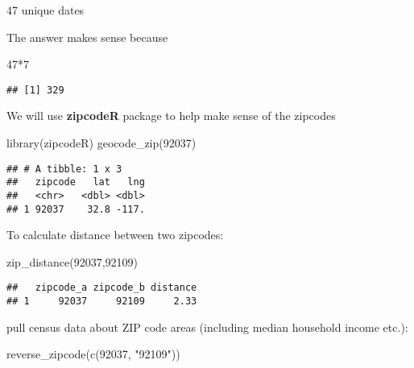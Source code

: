 \documentclass[
]{article}
\newenvironment{Shaded}{\begin{snugshade}}{\end{snugshade}}
\newcommand{\DecValTok}[1]{\textcolor[rgb]{0.00,0.00,0.81}{#1}}
\newcommand{\FunctionTok}[1]{\textcolor[rgb]{0.00,0.00,0.00}{#1}}
\newcommand{\NormalTok}[1]{#1}
\newcommand{\SpecialCharTok}[1]{\textcolor[rgb]{0.00,0.00,0.00}{#1}}
\newcommand{\StringTok}[1]{\textcolor[rgb]{0.31,0.60,0.02}{#1}}
\begin{document}
47 unique dates

The answer makes sense because

\begin{Shaded}
\begin{Highlighting}[]
\DecValTok{47}\SpecialCharTok{*}\DecValTok{7}
\end{Highlighting}
\end{Shaded}

\begin{verbatim}
## [1] 329
\end{verbatim}

We will use \textbf{zipcodeR} package to help make sense of the zipcodes

\begin{Shaded}
\begin{Highlighting}[]
\FunctionTok{library}\NormalTok{(zipcodeR)}
\FunctionTok{geocode\_zip}\NormalTok{(}\StringTok{\textquotesingle{}92037\textquotesingle{}}\NormalTok{)}
\end{Highlighting}
\end{Shaded}

\begin{verbatim}
## # A tibble: 1 x 3
##   zipcode   lat   lng
##   <chr>   <dbl> <dbl>
## 1 92037    32.8 -117.
\end{verbatim}

To calculate distance between two zipcodes:

\begin{Shaded}
\begin{Highlighting}[]
\FunctionTok{zip\_distance}\NormalTok{(}\StringTok{\textquotesingle{}92037\textquotesingle{}}\NormalTok{,}\StringTok{\textquotesingle{}92109\textquotesingle{}}\NormalTok{)}
\end{Highlighting}
\end{Shaded}

\begin{verbatim}
##   zipcode_a zipcode_b distance
## 1     92037     92109     2.33
\end{verbatim}

pull census data about ZIP code areas (including median household income
etc.):

\begin{Shaded}
\begin{Highlighting}[]
\FunctionTok{reverse\_zipcode}\NormalTok{(}\FunctionTok{c}\NormalTok{(}\StringTok{\textquotesingle{}92037\textquotesingle{}}\NormalTok{, }\StringTok{"92109"}\NormalTok{))}
\end{Highlighting}
\end{Shaded}
\end{document}
